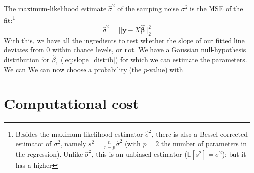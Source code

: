 The maximum-likelihood estimate $\hat{σ}^2$ of the samping noise $σ^2$ is the MSE of the fit:\footnote{
    Besides the maximum-likelihood estimator $\hat{σ}^2$, there is also a Bessel-corrected estimator of $σ^2$, namely $s^2 = \frac{n}{n-p} \hat{σ}^2$ (with $p = 2$ the number of parameters in the regression). Unlike $\hat{σ}^2$, this is an unbiased estimator ($\mathbb{E}[s^2] = σ^2$); but it has a higher
}
\begin{equation}
    \hat{σ}^2 = || \bm{y} - X \bm{\hat{β}} ||_2^2
\end{equation}
With this, we have all the ingredients to test whether the slope of our fitted line deviates from $0$ within chance levels, or not. We have a Gaussian null-hypothesis distribution for $\hat{β}_1$ (\cref{eq:slope_distrib}) for which we can estimate the parameters. We can
We can now choose a probability (the $p$-value) with









\section{Computational cost}

